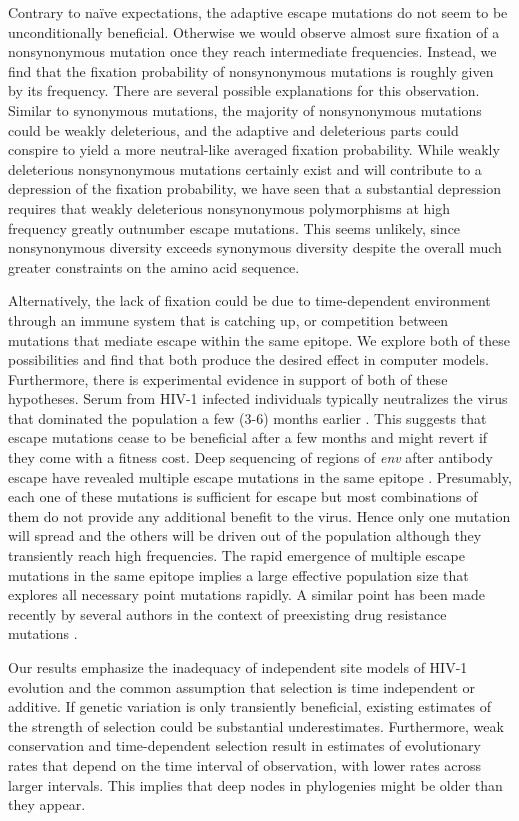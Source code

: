 \documentclass[rmp, twocolumn]{revtex4}
\newcommand{\env}{\textit{env}}
\begin{document}
Contrary to na\"ive expectations, the adaptive escape mutations do not seem to
be unconditionally beneficial. Otherwise we would observe almost sure fixation
of a nonsynonymous mutation once they reach intermediate frequencies. Instead, we
find that the fixation probability of nonsynonymous mutations is roughly given
by its frequency. There are several possible explanations for this observation.
Similar to synonymous mutations, the majority of nonsynonymous mutations could
be weakly deleterious, and the adaptive and deleterious parts could conspire to yield a
more neutral-like averaged fixation probability. While weakly deleterious 
nonsynonymous mutations certainly exist and will contribute to a depression of the
fixation probability, we have seen that a substantial depression requires that
weakly deleterious nonsynonymous polymorphisms at high frequency greatly 
outnumber escape mutations. This seems unlikely, since nonsynonymous diversity
exceeds synonymous diversity despite the overall much greater constraints on
the amino acid sequence. 

Alternatively, the lack of fixation could be due to time-dependent environment
through an immune system that is catching up, or competition between mutations
that mediate escape within the same epitope. We explore both of these
possibilities and find that both produce the desired effect in computer models. Furthermore, there
is experimental evidence in support of both of these hypotheses. Serum from HIV-1
infected individuals typically neutralizes the virus that dominated the
population a few (3-6) months earlier \citep{richman_rapid_2003}. This suggests that
escape mutations cease to be beneficial after a few months and might revert if
they come with a fitness cost. Deep sequencing of regions of \env{} after
antibody escape have revealed multiple escape mutations in the same epitope
\citep{moore_limited_2009, bar_early_2012}. Presumably, each one of these
mutations is sufficient for escape but most combinations of them do not provide
any additional benefit to the virus. Hence only one mutation will spread and the
others will be driven out of the population although they transiently reach high
frequencies. The rapid emergence of multiple escape mutations in the same
epitope implies a large effective population size that explores all necessary point
mutations rapidly. A similar point has been made recently by several authors
in the context of preexisting drug resistance mutations
\citep{boltz_ultrasensitive_2012, pennings_loss_2013}. 

Our results emphasize the inadequacy of independent site models of HIV-1 evolution
and the common assumption that selection is time independent or additive. 
If genetic variation is only transiently beneficial, existing estimates of the
strength of selection \citep{neher_recombination_2010,batorsky_estimate_2011}
could be substantial underestimates. Furthermore, weak conservation and
time-dependent selection result in estimates of evolutionary 
rates that depend on the time interval of observation, with lower rates across
larger intervals. This implies that deep nodes in phylogenies might be older than 
they appear.
\end{document}
